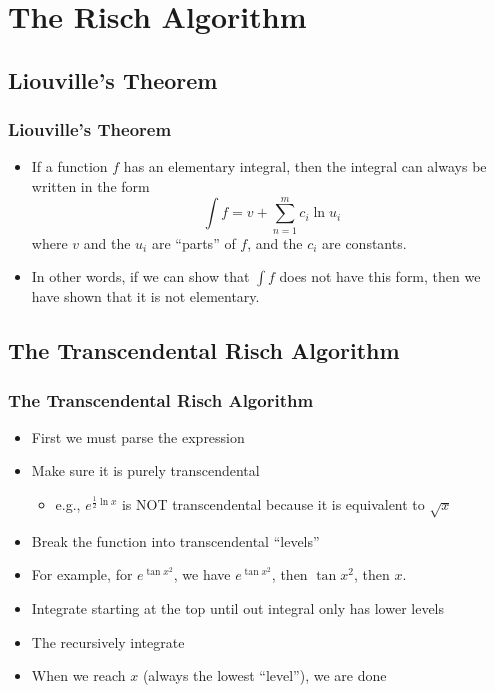 \documentclass{beamer}
\numberwithin{equation}{section} %
\begin{document}
\section{The Risch Algorithm}

\subsection{Liouville's Theorem}

\begin{frame}
    \frametitle{Liouville's Theorem}
    \begin{itemize}
        \item If a function $f$ has an elementary integral, then the
        integral can always be written in the form
        \begin{equation}
            \label{liouville's theorem}
            \int{f} = v + \sum_{n=1}^m{c_i\ln{u_i}}
        \end{equation}
        where $v$ and the $u_i$ are ``parts'' of $f$, and the $c_i$ are
        constants.
        \pause
        \item In other words, if we can show that $\int{f}$ does not
        have this form, then we have shown that it is not elementary.
    \end{itemize}
\end{frame}

\subsection{The Transcendental Risch Algorithm}

\begin{frame}
    \frametitle{The Transcendental Risch Algorithm}
    \begin{itemize}
        \item First we must parse the expression
        \item Make sure it is purely transcendental
        \begin{itemize}
            \item e.g., $e^{\frac{1}{2}\ln{x}}$ is NOT transcendental
            because it is equivalent to $\sqrt{x}$
        \end{itemize}
    \pause
    \item Break the function into transcendental ``levels''
    \item For example, for $e^{\tan{x^2}}$, we have $e^{\tan{x^2}}$,
    then $\tan{x^2}$, then $x$.
    \pause
    \item Integrate starting at the top until out integral only has
    lower levels
    \item The recursively integrate
    \item When we reach $x$ (always the lowest ``level''), we are done
    \end{itemize}
\end{frame}
\end{document}
